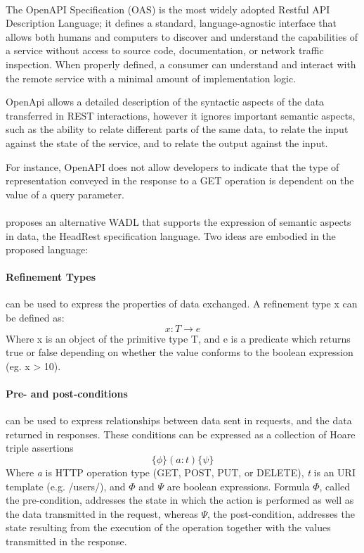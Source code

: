\paragraph{}

The OpenAPI Specification (OAS) \cite{openAPI} is the most widely adopted Restful API Description Language;
it defines a standard, language-agnostic interface that allows both humans and computers to discover and
understand the capabilities of a service without access to source code, documentation, or network traffic inspection.
When properly defined, a consumer can understand and interact with the remote service with a minimal amount of implementation logic.

OpenApi allows a detailed description of the syntactic aspects of the data transferred in REST interactions, however it ignores important semantic aspects, such as the ability to relate
different parts of the same data, to relate the input against the state of the service, and to relate the output against the input.

For instance, OpenAPI does not allow developers to indicate that the type of representation conveyed in the response to a GET operation is dependent on the value of a query parameter.

\paragraph{}

\citeauthor{headRest} \cite{headRest} proposes an alternative WADL that supports the expression of semantic aspects in data, the HeadRest specification language.
Two ideas are embodied in the proposed language:

\paragraph{Refinement Types} \cite{freeman1991refinement} can be used to express the properties of data exchanged.
A refinement type x can be defined as:
\[ x:T \rightarrow e \]
Where x is an object of the primitive type T, and e is a predicate which returns true or false depending on whether the value conforms to the boolean expression (eg. x > 10).

\paragraph{Pre- and post-conditions} can be used to express relationships between data sent in
requests, and the data returned in responses. These conditions can be expressed as a collection of Hoare triple assertions
\[ \{\phi\} (a : t) \{\psi\} \]
Where \emph{a} is HTTP operation type (GET, POST, PUT, or DELETE), \emph{t} is an URI template (e.g. /users/), and $\Phi$ and $\Psi$ are boolean expressions.
Formula $\Phi$, called the pre-condition, addresses the state in which the action is performed as well as the data transmitted in the request,
whereas $\Psi$, the post-condition, addresses the state resulting from the execution of the operation together with the values transmitted in the response.

